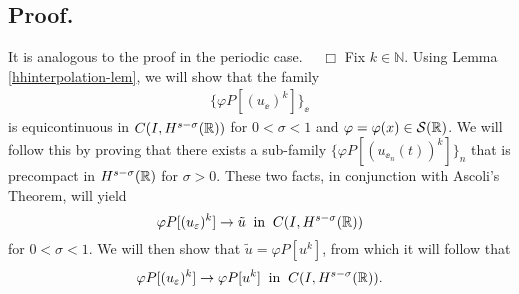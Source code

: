		\subsection{ Proof.} It is analogous to the proof in the periodic case.
		$\quad \Box$
		Fix $k \in \mathbb{N}$. Using Lemma \ref{hhinterpolation-lem}, we
		will show that the family
		\begin{equation*}
			\begin{split}
			 \{\varphi P[(u_\ee)^k]\}_\ee
		\end{split}
	\end{equation*}
		is equicontinuous in $C(I, H^{s-\sigma}(\mathbb{R}))$ 
		for $0 < \sigma < 1$ and $\varphi = \varphi(x) \in \mathcal{S}(\mathbb{R})$.
		We will follow this by proving that
		there exists a sub-family $\{\varphi P[(u_{\ee_n}(t))^k]\}_n$
		that is precompact in $H^{s-\sigma}(\mathbb{R})$ for $\sigma > 0$. 
		These two facts, in conjunction with Ascoli's Theorem, will
		yield
		\begin{equation*}
			\label{hhstrong-conv2}
			\varphi P[(u_\varepsilon)^k] \to \tilde{u}
			\; \; \text{in} \; \; C(I,H^{s-\sigma}(\mathbb{R}))
		\end{equation*}
		for $0 < \sigma < 1$.
		We will then show that $\tilde{u} = \varphi P[u^k]$, from which it will
		follow that
		\begin{equation*}
			\label{hhphiplus}
			\begin{split}
				\varphi P[(u_\varepsilon)^k] \to \varphi P[u^k]
				\; \; \text{in} \; \; C(I,H^{s-\sigma}(\mathbb{R})).
			\end{split}
		\end{equation*}
